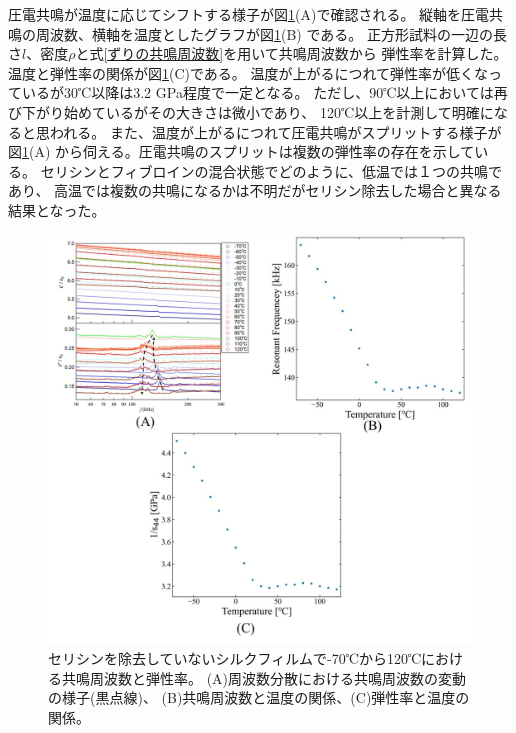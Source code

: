 \documentclass[dvipdfmx,12pt,a4paper]{jreport}
\begin{document}
			圧電共鳴が温度に応じてシフトする様子が図\ref{温度_弾性率_セリシンあり}(A)で確認される。
			縦軸を圧電共鳴の周波数、横軸を温度としたグラフが図\ref{温度_弾性率_セリシンあり}(B)
			である。
			正方形試料の一辺の長さ$l$、密度$\rho$と式\eqref{ずりの共鳴周波数}を用いて共鳴周波数から
			弾性率を計算した。温度と弾性率の関係が図\ref{温度_弾性率_セリシンあり}(C)である。
			温度が上がるにつれて弾性率が低くなっているが30℃以降は3.2 GPa程度で一定となる。
			ただし、90℃以上においては再び下がり始めているがその大きさは微小であり、
			120℃以上を計測して明確になると思われる。
			また、温度が上がるにつれて圧電共鳴がスプリットする様子が図\ref{温度_弾性率_セリシンあり}(A)
			から伺える。圧電共鳴のスプリットは複数の弾性率の存在を示している。
			セリシンとフィブロインの混合状態でどのように、低温では１つの共鳴であり、
			高温では複数の共鳴になるかは不明だがセリシン除去した場合と異なる結果となった。
			\begin{figure}[h]
				\centering
				\includegraphics[width=\linewidth]{温度_誘電率_セリシンあり_拡大.jpg}
				\caption{セリシンを除去していないシルクフィルムで-70℃から120℃における共鳴周波数と弾性率。
				(A)周波数分散における共鳴周波数の変動の様子(黒点線)、
				(B)共鳴周波数と温度の関係、(C)弾性率と温度の関係。}
				\label{温度_弾性率_セリシンあり}
			\end{figure}
\end{document}
